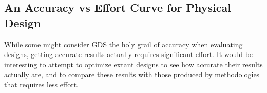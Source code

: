 \documentclass{article}
\begin{document}
\subsection{An Accuracy vs Effort Curve for Physical Design}

While some might consider GDS the holy grail of accuracy when evaluating
designs, getting accurate results actually requires significant effort.  It
would be interesting to attempt to optimize extant designs to see how accurate
their results actually are, and to compare these results with those produced by
methodologies that requires less effort.
\end{document}
